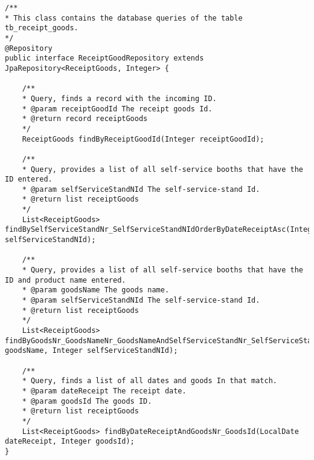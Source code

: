 \lstset{language=java}
\begin{lstlisting}[frame=tb, caption={Das Listing zeigt das Interface ReceiptGoodRepository im Paket repository}, label={lst:ReceiptGoodRepository}]
/**
* This class contains the database queries of the table tb_receipt_goods.
*/
@Repository
public interface ReceiptGoodRepository extends JpaRepository<ReceiptGoods, Integer> {
	
	/**
	* Query, finds a record with the incoming ID.
	* @param receiptGoodId The receipt goods Id.
	* @return record receiptGoods
	*/
	ReceiptGoods findByReceiptGoodId(Integer receiptGoodId);
	
	/**
	* Query, provides a list of all self-service booths that have the ID entered.
	* @param selfServiceStandNId The self-service-stand Id.
	* @return list receiptGoods
	*/
	List<ReceiptGoods> findBySelfServiceStandNr_SelfServiceStandNIdOrderByDateReceiptAsc(Integer selfServiceStandNId);
	
	/**
	* Query, provides a list of all self-service booths that have the ID and product name entered.
	* @param goodsName The goods name.
	* @param selfServiceStandNId The self-service-stand Id.
	* @return list receiptGoods
	*/
	List<ReceiptGoods> findByGoodsNr_GoodsNameNr_GoodsNameAndSelfServiceStandNr_SelfServiceStandNId(String goodsName, Integer selfServiceStandNId);
	
	/**
	* Query, finds a list of all dates and goods In that match.
	* @param dateReceipt The receipt date.
	* @param goodsId The goods ID.
	* @return list receiptGoods
	*/
	List<ReceiptGoods> findByDateReceiptAndGoodsNr_GoodsId(LocalDate dateReceipt, Integer goodsId);
}
\end{lstlisting}

